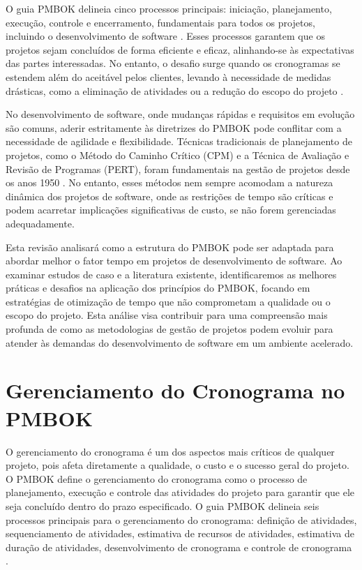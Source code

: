 \documentclass[
	12pt,				%
	oneside,			%
	a4paper,			%
	english,			%
	brazil				%
	]{abntex2unama}
\begin{document}
O guia PMBOK delineia cinco processos principais: iniciação, planejamento, execução, controle e encerramento, fundamentais para todos os projetos, incluindo o desenvolvimento de software \cite{Marcelino_Analysis_2022}. Esses processos garantem que os projetos sejam concluídos de forma eficiente e eficaz, alinhando-se às expectativas das partes interessadas. No entanto, o desafio surge quando os cronogramas se estendem além do aceitável pelos clientes, levando à necessidade de medidas drásticas, como a eliminação de atividades ou a redução do escopo do projeto \cite{Ghasemabadi_PMBOK_2011}.

No desenvolvimento de software, onde mudanças rápidas e requisitos em evolução são comuns, aderir estritamente às diretrizes do PMBOK pode conflitar com a necessidade de agilidade e flexibilidade. Técnicas tradicionais de planejamento de projetos, como o Método do Caminho Crítico (CPM) e a Técnica de Avaliação e Revisão de Programas (PERT), foram fundamentais na gestão de projetos desde os anos 1950 \cite{Ghasemabadi_PMBOK_2011}. No entanto, esses métodos nem sempre acomodam a natureza dinâmica dos projetos de software, onde as restrições de tempo são críticas e podem acarretar implicações significativas de custo, se não forem gerenciadas adequadamente.

Esta revisão analisará como a estrutura do PMBOK pode ser adaptada para abordar melhor o fator tempo em projetos de desenvolvimento de software. Ao examinar estudos de caso e a literatura existente, identificaremos as melhores práticas e desafios na aplicação dos princípios do PMBOK, focando em estratégias de otimização de tempo que não comprometam a qualidade ou o escopo do projeto. Esta análise visa contribuir para uma compreensão mais profunda de como as metodologias de gestão de projetos podem evoluir para atender às demandas do desenvolvimento de software em um ambiente acelerado.


\chapter{Gerenciamento do Cronograma no PMBOK}

O gerenciamento do cronograma é um dos aspectos mais críticos de qualquer projeto, pois afeta diretamente a qualidade, o custo e o sucesso geral do projeto. O PMBOK define o gerenciamento do cronograma como o processo de planejamento, execução e controle das atividades do projeto para garantir que ele seja concluído dentro do prazo especificado. O guia PMBOK delineia seis processos principais para o gerenciamento do cronograma: definição de atividades, sequenciamento de atividades, estimativa de recursos de atividades, estimativa de duração de atividades, desenvolvimento de cronograma e controle de cronograma \cite{Project_Management_Institute_PMBOK_2017}.
\end{document}
